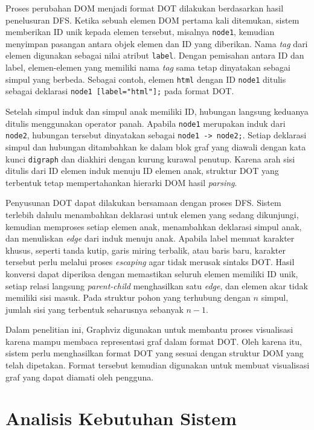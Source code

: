 Proses perubahan DOM menjadi format DOT dilakukan berdasarkan hasil penelusuran DFS. Ketika sebuah elemen DOM pertama kali ditemukan, sistem memberikan ID unik kepada elemen tersebut, misalnya \texttt{node1}, kemudian menyimpan pasangan antara objek elemen dan ID yang diberikan. Nama \textit{tag} dari elemen digunakan sebagai nilai atribut \texttt{label}. Dengan pemisahan antara ID dan label, elemen-elemen yang memiliki nama \textit{tag} sama tetap dinyatakan sebagai simpul yang berbeda. Sebagai contoh, elemen \texttt{html} dengan ID \texttt{node1} ditulis sebagai deklarasi \texttt{node1 [label="html"];} pada format DOT.

Setelah simpul induk dan simpul anak memiliki ID, hubungan langsung keduanya ditulis menggunakan operator panah. Apabila \texttt{node1} merupakan induk dari \texttt{node2}, hubungan tersebut dinyatakan sebagai \texttt{node1 -> node2;}. Setiap deklarasi simpul dan hubungan ditambahkan ke dalam blok graf yang diawali dengan kata kunci \texttt{digraph} dan diakhiri dengan kurung kurawal penutup. Karena arah sisi ditulis dari ID elemen induk menuju ID elemen anak, struktur DOT yang terbentuk tetap mempertahankan hierarki DOM hasil \textit{parsing}.

Penyusunan DOT dapat dilakukan bersamaan dengan proses DFS. Sistem terlebih dahulu menambahkan deklarasi untuk elemen yang sedang dikunjungi, kemudian memproses setiap elemen anak, menambahkan deklarasi simpul anak, dan menuliskan \textit{edge} dari induk menuju anak. Apabila label memuat karakter khusus, seperti tanda kutip, garis miring terbalik, atau baris baru, karakter tersebut perlu melalui proses \textit{escaping} agar tidak merusak sintaks DOT. Hasil konversi dapat diperiksa dengan memastikan seluruh elemen memiliki ID unik, setiap relasi langsung \textit{parent-child} menghasilkan satu \textit{edge}, dan elemen akar tidak memiliki sisi masuk. Pada struktur pohon yang terhubung dengan $n$ simpul, jumlah sisi yang terbentuk seharusnya sebanyak $n-1$.

Dalam penelitian ini, Graphviz digunakan untuk membantu proses visualisasi karena mampu membaca representasi graf dalam format DOT. Oleh karena itu, sistem perlu menghasilkan format DOT yang sesuai dengan struktur DOM yang telah dipetakan. Format tersebut kemudian digunakan untuk membuat visualisasi graf yang dapat diamati oleh pengguna.

\section{Analisis Kebutuhan Sistem}
\label{sec:analisis-kebutuhan-sistem}

